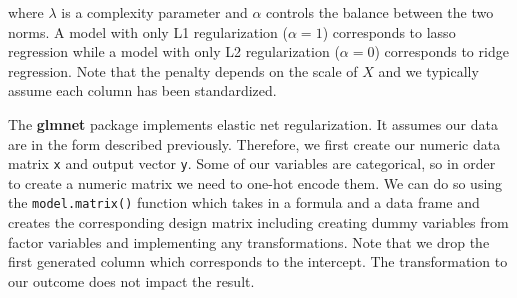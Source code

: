 \documentclass[
  letterpaper,
]{latex/krantz}
\begin{document}
where \(\lambda\) is a complexity parameter and \(\alpha\) controls the
balance between the two norms. A model with only L1 regularization
(\(\alpha = 1\)) corresponds to lasso regression
 while a model with only L2 regularization
(\(\alpha=0\)) corresponds to ridge regression.
Note that the penalty depends on the scale of \(X\) and we typically
assume each column has been standardized.

The \textbf{glmnet} package  implements elastic
net regularization. It assumes our data are in the form described
previously. Therefore, we first create our numeric data matrix
\texttt{x} and output vector \texttt{y}. Some of our variables are
categorical, so in order to create a numeric matrix we need to one-hot
encode them. We can do so using the
\texttt{model.matrix()}
function which takes in a formula and a data frame and creates the
corresponding design matrix including creating dummy variables from
factor variables and implementing any transformations. Note that we drop
the first generated column which corresponds to the intercept. The
transformation to our outcome does not impact the result.
\end{document}

